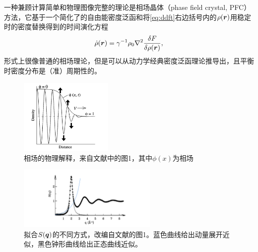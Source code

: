 \documentclass[hyperref, UTF8, a4paper]{ctexart}
\begin{document}
一种兼顾计算简单和物理图像完整的理论是相场晶体（phase field crystal, PFC）方法，它基于一个简化了的自由能密度泛函和将\eqref{eq:ddft}右边括号内的$\rho(\vb*{r})$用稳定时的密度替换得到的时间演化方程
\begin{equation}
    \dot{\rho}(\vb*{r}) = \gamma^{-1} \rho_0 \laplacian \fdv{F}{\rho(\vb*{r})},
    \label{eq:pfc-eom}
\end{equation}
形式上很像普通的相场理论，但是可以从动力学经典密度泛函理论推导出，且平衡时密度分布是（准）周期性的\cite{pfc2009,PhysRevB.75.064107}。

\begin{figure}
    \centering
    \includegraphics[width=0.4\textwidth]{phase-field.PNG}
    \caption{相场的物理解释，来自文献\cite{boettinger2002phase}中的图1，其中$\phi(x)$为相场}
    \label{fig:phase-field}
\end{figure}

\begin{figure}
    \centering
    \includegraphics[width=0.6\textwidth]{sq-adapted.png}
    \caption{拟合$S(\vb*{q})$的不同方式，改编自文献\cite{PhysRevE.70.051605}的图1。蓝色曲线给出动量展开近似，黑色钟形曲线给出正态曲线近似。}
    \label{fig:sq-fitting}
\end{figure}
\end{document}
